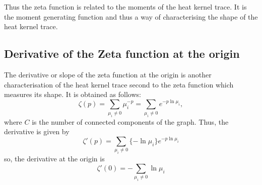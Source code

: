 \documentclass[10pt,a4paper]{article}
\theoremstyle{plain}
\theoremstyle{definition}
\begin{document}
    Thus the zeta function is related to the moments of the heat kernel trace. It is the moment generating function and thus a way of characterising the shape of the heat kernel trace.
    
      \subsection{Derivative of the Zeta function at the origin}
    
    The derivative or slope of the zeta function at the origin is another characterisation of the heat kernel trace second to the zeta function which measures its shape. It is obtained as follows:
  	\begin{equation}
  	\zeta(p) = \sum_{\mu_i \neq 0} \mu_{i} ^{-p} = \sum_{\mu_i \neq 0} e^{-p \ln \mu_i},
  	\end{equation}
  	where $C$ is the number of connected components of the graph.
  	Thus, the derivative is given by
  	\begin{equation}
  	\zeta'(p) = \sum_{\mu_i \neq 0} \{-\ln \mu_i\}
  	e^{-p \ln \mu_i}
  	\end{equation}
  	so, the derivative at the origin is 
    \begin{equation}
    \zeta'(0) = -\sum_{\mu_i \neq 0}\ln \mu_i
    \label{final-zeta}
    \end{equation}
    
\end{document}
